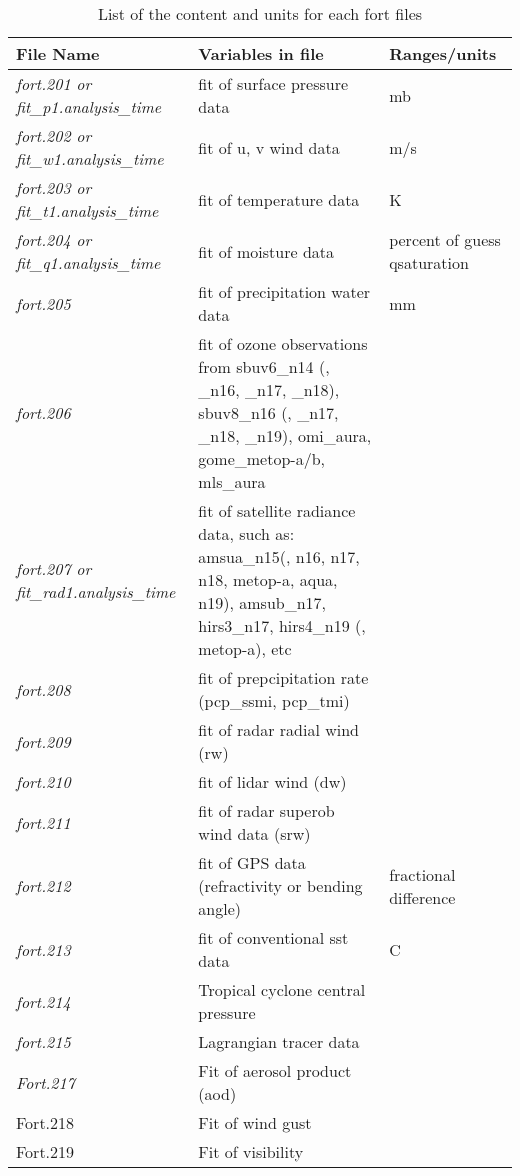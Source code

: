 \begin{table}[htbp]
\centering
\caption{List of the content and units for each fort files}
\begin{tabular}{|p{4cm}|p{7cm}|p{3cm}|}
\hline
\hline
File Name & Variables in file & Ranges/units \\
\hline
\textit{fort.201 or fit\_p1.analysis\_time} & fit of surface pressure data & mb \\
\hline
\textit{fort.202 or fit\_w1.analysis\_time} & fit of u, v wind data & m/s \\
\hline
\textit{fort.203 or fit\_t1.analysis\_time} & fit of temperature data & K \\
\hline
\textit{fort.204 or fit\_q1.analysis\_time} & fit of moisture data & percent of guess qsaturation \\
\hline
\textit{fort.205} & fit of precipitation water data & mm \\
\hline
\textit{fort.206} & fit of ozone observations from sbuv6\_n14 (, \_n16, \_n17, \_n18), sbuv8\_n16 (, \_n17, \_n18, \_n19), omi\_aura, gome\_metop-a/b, mls\_aura &  \\
\hline
\textit{fort.207 or fit\_rad1.analysis\_time} & fit of satellite radiance data, such as:
amsua\_n15(, n16, n17, n18, metop-a, aqua, n19), amsub\_n17, hirs3\_n17, hirs4\_n19 (, metop-a), etc & \\
\hline	
\textit{fort.208} & fit of prepcipitation rate (pcp\_ssmi, pcp\_tmi) & \\	
\hline
\textit{fort.209} & fit of radar radial wind (rw) & \\
\hline
\textit{fort.210} & fit of lidar wind (dw) & \\
\hline
\textit{fort.211} & fit of radar superob wind data (srw) & \\
\hline	
\textit{fort.212} & fit of GPS data (refractivity or bending angle) & fractional difference \\
\hline
\textit{fort.213} & fit of conventional sst data & C \\
\hline
\textit{fort.214} & Tropical cyclone central pressure &  \\
\hline
\textit{fort.215} & Lagrangian tracer data &  \\
\hline
\textit{Fort.217} & Fit of aerosol product (aod) &  \\
\hline	
Fort.218 & Fit of  wind gust &  \\
\hline	
Fort.219 & Fit of visibility &
 \\
\hline
\end{tabular}
\label{tab45}
\end{table} 

